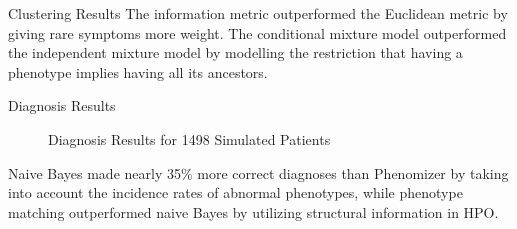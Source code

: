 \documentclass[final]{beamer} %
\begin{document}
\begin{frame}{}
\begin{columns}[T]
\begin{column}{0.3\linewidth}
{\begin{block}{\Huge Clustering Results }
       The information metric outperformed the Euclidean metric by
       giving rare symptoms more weight. The conditional mixture model
       outperformed the independent mixture model by modelling the
       restriction that having a phenotype implies having all its
       ancestors.
     \end{block}
     \vfill
     \begin{block}{\Huge Diagnosis Results}
       \begin{figure}
         \centering
         \caption{Diagnosis Results for 1498 Simulated Patients}
       \end{figure}
       \large Naive Bayes made nearly 35\% more correct diagnoses than
       Phenomizer by taking into account the incidence rates of
       abnormal phenotypes, while phenotype matching outperformed
       naive Bayes by utilizing structural information in HPO.

     \end{block}
}
 \end{column}

\end{columns}
\end{frame}
\end{document}
